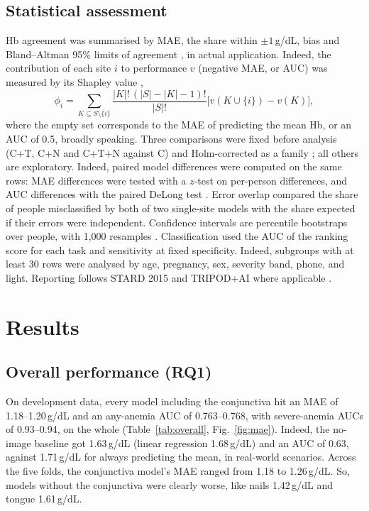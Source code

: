 \documentclass[10pt,a4paper,twocolumn]{article}
\newcommand{\gdl}{\,g/dL}
\begin{document}
\subsection{Statistical assessment}
Hb agreement was summarised by MAE, the share within $\pm1$\gdl, bias and Bland--Altman 95\% limits of agreement \cite{blandaltman1986}, in actual application. Indeed, the contribution of each site $i$ to performance $v$ (negative MAE, or AUC) was measured by its Shapley value \cite{shapley1953},
\begin{equation}
\phi_i=\sum_{K\subseteq S\setminus\{i\}}\frac{|K|!\,(|S|-|K|-1)!}{|S|!}\big[v(K\cup\{i\})-v(K)\big],
\end{equation}
where the empty set corresponds to the MAE of predicting the mean Hb, or an AUC of 0.5, broadly speaking. Three comparisons were fixed before analysis (C+T, C+N and C+T+N against C) and Holm-corrected as a family \cite{holm1979}; all others are exploratory. Indeed, paired model differences were computed on the same rows: MAE differences were tested with a $z$-test on per-person differences, and AUC differences with the paired DeLong test \cite{delong1988}. Error overlap compared the share of people misclassified by both of two single-site models with the share expected if their errors were independent. Confidence intervals are percentile bootstraps over people, with 1,000 resamples \cite{efron1979}. Classification used the AUC of the ranking score for each task and sensitivity at fixed specificity. Indeed, subgroups with at least 30 rows were analysed by age, pregnancy, sex, severity band, phone, and light. Reporting follows STARD 2015 and TRIPOD+AI where applicable \cite{bossuyt2015,collins2024}.

\section{Results}

\subsection{Overall performance (RQ1)}
On development data, every model including the conjunctiva hit an MAE of 1.18--1.20\gdl{} and an any-anemia AUC of 0.763--0.768, with severe-anemia AUCs of 0.93--0.94, on the whole (Table~\ref{tab:overall}, Fig.~\ref{fig:mae}). Indeed, the no-image baseline got 1.63\gdl{} (linear regression 1.68\gdl) and an AUC of 0.63, against 1.71\gdl{} for always predicting the mean, in real-world scenarios. Across the five folds, the conjunctiva model's MAE ranged from 1.18 to 1.26\gdl. So, models without the conjunctiva were clearly worse, like nails 1.42\gdl{} and tongue 1.61\gdl.
\end{document}
